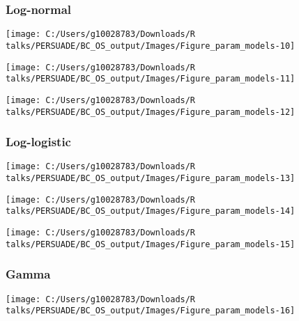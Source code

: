 \documentclass[
]{article}
\begin{document}
\subsubsection{Log-normal}\label{log-normal}

\begin{flushleft}\texttt{[image: C:/Users/g10028783/Downloads/R talks/PERSUADE/BC\_OS\_output/Images/Figure\_param\_models-10]} \end{flushleft}

\begin{flushleft}\texttt{[image: C:/Users/g10028783/Downloads/R talks/PERSUADE/BC\_OS\_output/Images/Figure\_param\_models-11]} \end{flushleft}

\begin{flushleft}\texttt{[image: C:/Users/g10028783/Downloads/R talks/PERSUADE/BC\_OS\_output/Images/Figure\_param\_models-12]} \end{flushleft}

\clearpage

\subsubsection{Log-logistic}\label{log-logistic}

\begin{flushleft}\texttt{[image: C:/Users/g10028783/Downloads/R talks/PERSUADE/BC\_OS\_output/Images/Figure\_param\_models-13]} \end{flushleft}

\begin{flushleft}\texttt{[image: C:/Users/g10028783/Downloads/R talks/PERSUADE/BC\_OS\_output/Images/Figure\_param\_models-14]} \end{flushleft}

\begin{flushleft}\texttt{[image: C:/Users/g10028783/Downloads/R talks/PERSUADE/BC\_OS\_output/Images/Figure\_param\_models-15]} \end{flushleft}

\clearpage

\subsubsection{Gamma}\label{gamma}

\begin{flushleft}\texttt{[image: C:/Users/g10028783/Downloads/R talks/PERSUADE/BC\_OS\_output/Images/Figure\_param\_models-16]} \end{flushleft}
\end{document}
